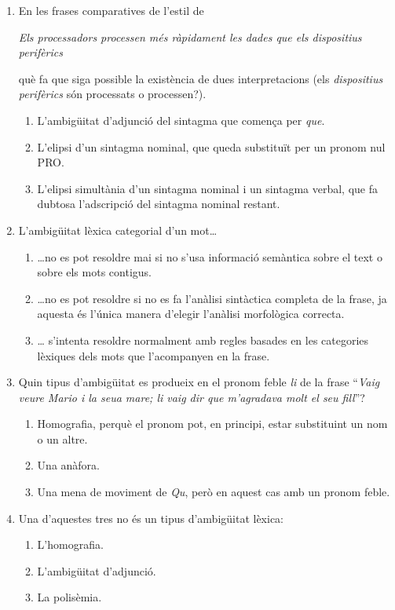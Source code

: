 \begin{enumerate}
\item En les frases comparatives de l'estil de
  \begin{center}\emph{Els processadors processen més ràpidament les
      dades que els dispositius perifèrics}\end{center} què fa que
  siga possible la existència de dues interpretacions (els
  \emph{dispositius perifèrics} són processats o processen?).
  \begin{enumerate}
  \item L'ambigüitat d'adjunció del sintagma que comença per
    \emph{que}.
  \item L'elipsi d'un sintagma nominal, que queda substituït per un
    pronom nul PRO.
  \item L'elipsi simultània d'un sintagma nominal i un sintagma
    verbal, que fa dubtosa l'adscripció del sintagma nominal restant.
  \end{enumerate}

\item L'ambigüitat lèxica categorial d'un mot{\ldots}
  \begin{enumerate}
  \item {\ldots}no es pot resoldre mai si no s'usa informació
    semàntica sobre el text o sobre els mots contigus.
  \item {\ldots}no es pot resoldre si no es fa l'anàlisi sintàctica
    completa de la frase, ja aquesta és l'única manera d'elegir
    l'anàlisi morfològica correcta.
  \item {\ldots} s'intenta resoldre normalment amb regles basades en
    les categories lèxiques dels mots que l'acompanyen en la frase.
  \end{enumerate}

\item Quin tipus d'ambigüitat es produeix en el pronom feble \emph{li}
  de la frase ``\emph{Vaig veure Mario i la seua mare; li vaig dir que
    m'agradava molt el seu fill}''?
  \begin{enumerate}
  \item Homografia, perquè el pronom pot, en principi, estar
    substituint un nom o un altre.
  \item Una anàfora.
  \item Una mena de moviment de \emph{Qu}, però en aquest cas amb un
    pronom feble.
  \end{enumerate}

\item Una d'aquestes tres no és un tipus d'ambigüitat lèxica:
  \begin{enumerate}
  \item L'homografia.
  \item L'ambigüitat d'adjunció.
  \item La polisèmia.
  \end{enumerate}


\end{enumerate}
